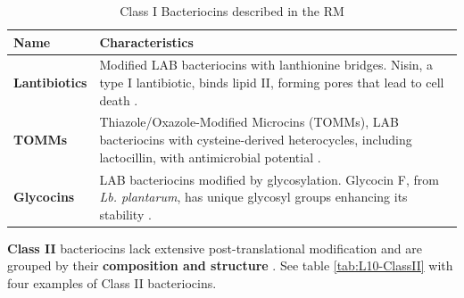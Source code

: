 \begin{table}[h]
    \centering
    \caption{Class I Bacteriocins described in the RM}
    \label{tab:L10-ClassI}
    \begin{tabular}{m{3cm}|p{10cm}} 
        \textbf{Name} & \textbf{Characteristics} \\
        \hline
        \vspace{0.5em}
        \textbf{Lantibiotics} & Modified LAB bacteriocins with lanthionine bridges. Nisin, a type I lantibiotic, binds lipid II, forming pores that lead to cell death \cite*{L10-MicroFunct}. \\

        \vspace{0.5em}
        \textbf{TOMMs} & Thiazole/Oxazole-Modified Microcins (TOMMs), LAB bacteriocins with cysteine-derived heterocycles, including lactocillin, with antimicrobial potential \cite*{L10-MicroFunct}. \\

        \vspace{0.5em}
        \textbf{Glycocins} & LAB bacteriocins modified by glycosylation. Glycocin F, from \textit{Lb. plantarum}, has unique glycosyl groups enhancing its stability \cite*{L10-MicroFunct}. \\
    \end{tabular}
\end{table}


\textbf{Class II} bacteriocins lack extensive post-translational modification and are grouped by their \textbf{composition and structure} \cite*{L10-MicroFunct}. See table \ref*{tab:L10-ClassII} with four examples of Class II bacteriocins.

